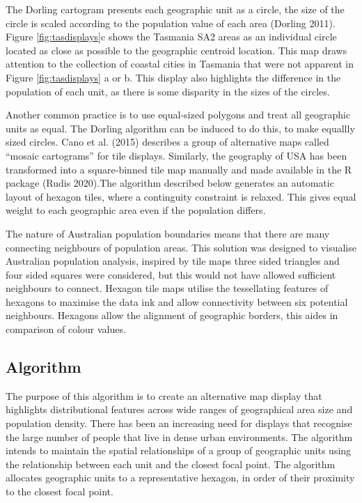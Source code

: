 The Dorling cartogram presents each geographic unit as a circle, the size of the circle is scaled according to the population value of each area (Dorling 2011). Figure \ref{fig:tasdisplays}c shows the Tasmania SA2 areas as an individual circle located as close as possible to the geographic centroid location. This map draws attention to the collection of coastal cities in Tasmania that were not apparent in Figure \ref{fig:tasdisplays} a or b. This display also highlights the difference in the population of each unit, as there is some disparity in the sizes of the circles.

Another common practice is to use equal-sized polygons and treat all geographic units as equal. The Dorling algorithm can be induced to do this, to make equallly sized circles. Cano et al. (2015) describes a group of alternative maps called ``mosaic cartograms'' for tile displays. Similarly, the geography of USA has been transformed into a square-binned tile map manually and made available in the R package  (Rudis 2020).The algorithm described below generates an automatic layout of hexagon tiles, where a continguity constraint is relaxed. This gives equal weight to each geographic area even if the population differs.

The nature of Australian population boundaries means that there are many connecting neighbours of population areas. This solution was designed to visualise Australian population analysis, inspired by tile maps three sided triangles and four sided squares were considered, but this would not have allowed sufficient neighbours to connect. Hexagon tile maps utilise the tessellating features of hexagons to maximise the data ink and allow connectivity between six potential neighbours. Hexagons allow the alignment of geographic borders, this aides in comparison of colour values.

\hypertarget{algorithm}{%
\subsection{Algorithm}\label{algorithm}}

The purpose of this algorithm is to create an alternative map display that highlights distributional features across wide ranges of geographical area size and population density. There has been an increasing need for displays that recognise the large number of people that live in dense urban environments. The algorithm intends to maintain the spatial relationships of a group of geographic units using the relationship between each unit and the closest focal point. The algorithm allocates geographic units to a representative hexagon, in order of their proximity to the closest focal point.

